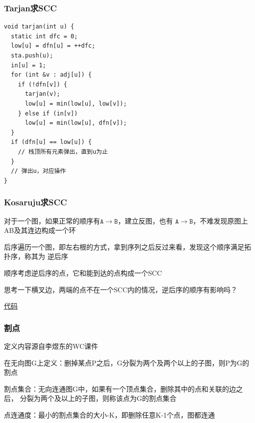 \documentclass{beamer}
\begin{document}
  \begin{frame}[fragile]
    \frametitle{Tarjan求SCC}
      \begin{lstlisting}
void tarjan(int u) {
  static int dfc = 0;
  low[u] = dfn[u] = ++dfc;
  sta.push(u);
  in[u] = 1;
  for (int &v : adj[u]) {
    if (!dfn[v]) {
      tarjan(v);
      low[u] = min(low[u], low[v]);
    } else if (in[v])
      low[u] = min(low[u], dfn[v]);
  }
  if (dfn[u] == low[u]) {
    // 栈顶所有元素弹出，直到u为止
  }
  // 弹出u，对应操作
}
      \end{lstlisting}
  \end{frame}

  \begin{frame}
    \frametitle{Kosaruju求SCC}
    对于一个图，如果正常的顺序有$\mathtt{A\to B}$，建立反图，也有
    $\mathtt{A\to B}$，不难发现原图上AB及其连边构成一个环

    \vspace*{1\baselineskip}
    
    后序遍历一个图，即左右根的方式，拿到序列之后反过来看，发现这个顺序满足拓扑序，称其为
    \textmd{逆后序}

    \pause

    \vspace*{1\baselineskip}
    
    顺序考虑逆后序的点，它和能到达的点构成一个SCC
    
    \pause
    \vspace*{1\baselineskip}

    思考一下横叉边，两端的点不在一个SCC内的情况，逆后序的顺序有影响吗？

    \href{http://syh521.cn/file/kosaraju.cpp}{代码}
  \end{frame}

  \begin{frame}
    \frametitle{割点}
    定义内容源自李煜东的WC课件

    \vspace*{1\baselineskip}
    
    在无向图G上定义：删掉某点P之后，G分裂为两个及两个以上的子图，则P为G的割点
    
    \vspace*{1\baselineskip}
    
    割点集合：无向连通图G中，如果有一个顶点集合，删除其中的点和关联的边之后，
    分裂为两个及以上的子图，则称该点为G的割点集合
    
    \vspace*{1\baselineskip}

    点连通度：最小的割点集合的大小-K，即删除任意K-1个点，图都连通
  \end{frame}
\end{document}
